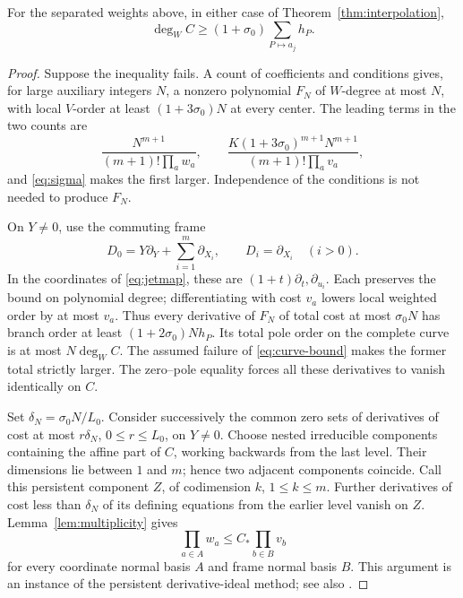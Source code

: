 \begin{proposition}\label{prop:curve}
For the separated weights above, in either case of
Theorem~\ref{thm:interpolation},
\begin{equation}\label{eq:curve-bound}
 \deg_W C\ge(1+\sigma_0)\sum_{P\mapsto a_j}h_P.
\end{equation}
\end{proposition}
\begin{proof}
Suppose the inequality fails. A count of coefficients and conditions
gives, for large auxiliary integers \(N\), a nonzero polynomial \(F_N\)
of \(W\)-degree at most \(N\), with local \(V\)-order at least
\((1+3\sigma_0)N\) at every center. The leading terms in the two counts
are
\[
 \frac{N^{m+1}}{(m+1)!\prod_aw_a},
 \qquad
 \frac{K(1+3\sigma_0)^{m+1}N^{m+1}}
      {(m+1)!\prod_av_a},
\]
and \eqref{eq:sigma} makes the first larger. Independence of the
conditions is not needed to produce \(F_N\).

On \(Y\ne0\), use the commuting frame
\[
 D_0=Y\partial_Y+\sum_{i=1}^m\partial_{X_i},
 \qquad D_i=\partial_{X_i}\quad(i>0).
\]
In the coordinates of \eqref{eq:jetmap}, these are
\((1+t)\partial_t,\partial_{u_i}\).
Each preserves the bound on polynomial degree; differentiating with
cost \(v_a\) lowers local weighted order by at most \(v_a\).
Thus every derivative of \(F_N\) of total cost at most
\(\sigma_0N\) has branch order at least
\((1+2\sigma_0)Nh_P\).
Its total pole order on the complete curve is at most \(N\deg_W C\).
The assumed failure of \eqref{eq:curve-bound} makes the former
total strictly larger. The zero--pole equality forces all these
derivatives to vanish identically on \(C\).

Set \(\delta_N=\sigma_0N/L_0\). Consider successively the common
zero sets of derivatives of cost at most \(r\delta_N\),
\(0\le r\le L_0\), on \(Y\ne0\).
Choose nested irreducible components containing the affine part of
\(C\), working backwards from the last level.
Their dimensions lie between \(1\) and \(m\); hence two adjacent
components coincide. Call this persistent component \(Z\), of
codimension \(k\), \(1\le k\le m\).
Further derivatives of cost less than \(\delta_N\) of its defining
equations from the earlier level vanish on \(Z\).
Lemma~\ref{lem:multiplicity} gives
\[
 \prod_{a\in A}w_a\le C_*\prod_{b\in B}v_b
\]
for every coordinate normal basis \(A\) and frame normal basis \(B\).
This argument is an instance of the persistent derivative-ideal method;
see also \cite[Section 5]{Philippon1986}.


\end{proof}
